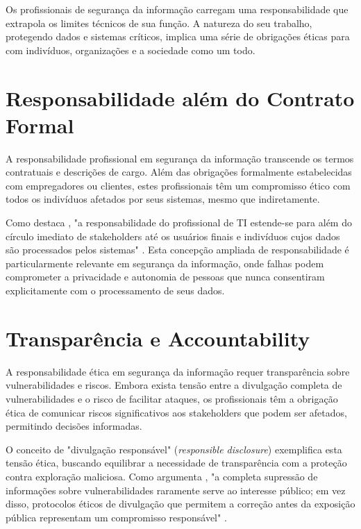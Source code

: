 Os profissionais de segurança da informação carregam uma responsabilidade que extrapola os limites técnicos de sua função. A natureza do seu trabalho, protegendo dados e sistemas críticos, implica uma série de obrigações éticas para com indivíduos, organizações e a sociedade como um todo.

\section{Responsabilidade além do Contrato Formal}

A responsabilidade profissional em segurança da informação transcende os termos contratuais e descrições de cargo. Além das obrigações formalmente estabelecidas com empregadores ou clientes, estes profissionais têm um compromisso ético com todos os indivíduos afetados por seus sistemas, mesmo que indiretamente.

Como destaca \citeauthor{burmeister2016applied}, "a responsabilidade do profissional de TI estende-se para além do círculo imediato de stakeholders até os usuários finais e indivíduos cujos dados são processados pelos sistemas" \cite{burmeister2016applied}. Esta concepção ampliada de responsabilidade é particularmente relevante em segurança da informação, onde falhas podem comprometer a privacidade e autonomia de pessoas que nunca consentiram explicitamente com o processamento de seus dados.

\section{Transparência e Accountability}

A responsabilidade ética em segurança da informação requer transparência sobre vulnerabilidades e riscos. Embora exista tensão entre a divulgação completa de vulnerabilidades e o risco de facilitar ataques, os profissionais têm a obrigação ética de comunicar riscos significativos aos stakeholders que podem ser afetados, permitindo decisões informadas.

O conceito de "divulgação responsável" (\textit{responsible disclosure}) exemplifica esta tensão ética, buscando equilibrar a necessidade de transparência com a proteção contra exploração maliciosa. Como argumenta \citeauthor{schneier2015data}, "a completa supressão de informações sobre vulnerabilidades raramente serve ao interesse público; em vez disso, protocolos éticos de divulgação que permitem a correção antes da exposição pública representam um compromisso responsável" \cite{schneier2015data}.

